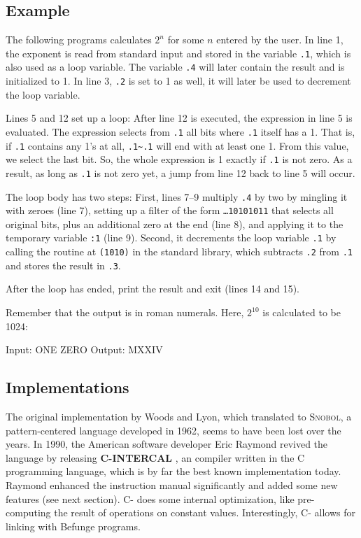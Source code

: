 \subsection{Example}

The following programs calculates $2^n$ for some $n$ entered by the user. In line 1, the exponent is read from standard input and stored in the variable \texttt{.1}, which is also used as a loop variable. The variable \texttt{.4} will later contain the result and is initialized to 1. In line 3, \texttt{.2} is set to 1 as well, it will later be used to decrement the loop variable.

Lines 5 and 12 set up a loop: After line 12 is executed, the expression in line 5 is evaluated. The expression selects from \texttt{.1} all bits where \texttt{.1} itself has a 1. That is, if \texttt{.1} contains any 1's at all, \texttt{.1\~{}.1} will end with at least one 1. From this value, we select the last bit. So, the whole expression is 1 exactly if \texttt{.1} is not zero. As a result, as long as \texttt{.1} is not zero yet, a jump from line 12 back to line 5 will occur.

The loop body has two steps: First, lines 7--9 multiply \texttt{.4} by two by mingling it with zeroes (line 7), setting up a filter of the form \texttt{\dots10101011} that selects all original bits, plus an additional zero at the end (line 8), and applying it to the temporary variable \texttt{:1} (line 9). Second, it decrements the loop variable \texttt{.1} by calling the routine at \texttt{(1010)} in the standard library, which subtracts \texttt{.2} from \texttt{.1} and stores the result in \texttt{.3}.

After the loop has ended, print the result and exit (lines 14 and 15).



Remember that the output is in roman numerals. Here, $2^{10}$ is calculated to be 1024:

\begin{io}
Input: ONE ZERO
Output: MXXIV
\end{io}

\subsection{Implementations}

The original implementation by Woods and Lyon, which translated \ic{} to \textsc{Snobol}, a pattern-centered language developed in 1962, seems to have been lost over the years. In 1990, the American software developer Eric Raymond revived the language by releasing \textbf{C-INTERCAL} \cite{raymond_intercal}, an \ic{} compiler written in the C programming language, which is by far the best known implementation today. Raymond enhanced the instruction manual \cite{raymond2010cintercal} significantly and added some new features (see next section). C-\ic{} does some internal optimization, like pre-computing the result of operations on constant values. Interestingly, C-\ic{} allows for linking with Befunge programs.

